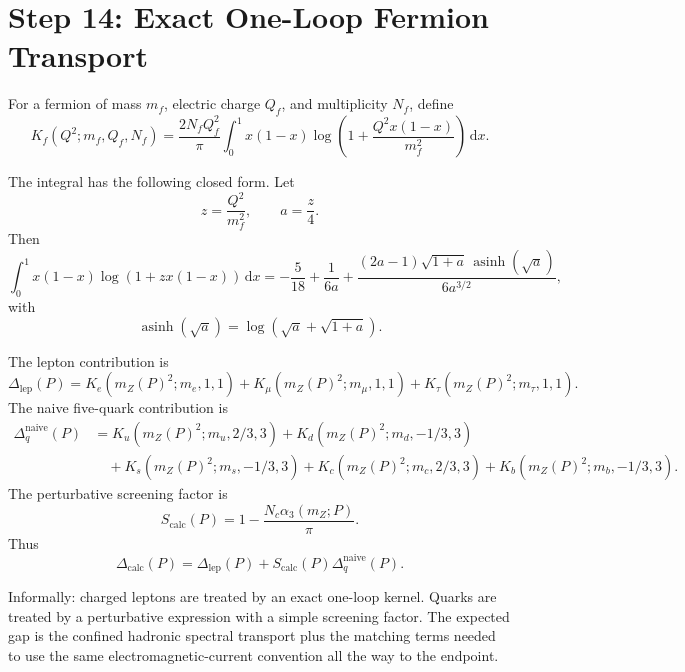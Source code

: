 \documentclass[11pt]{article}
\theoremstyle{remark}
\newcommand{\dd}{\,\mathrm d}
\newcommand{\Dcalc}{\Delta_{\mathrm{calc}}}
\newcommand{\Dlep}{\Delta_{\mathrm{lep}}}
\newcommand{\Nc}{N_c}
\begin{document}
\section{Step 14: Exact One-Loop Fermion Transport}

For a fermion of mass \(m_f\), electric charge \(Q_f\), and multiplicity \(N_f\), define
\begin{equation}
K_f(Q^2;m_f,Q_f,N_f)
=
\frac{2N_fQ_f^2}{\pi}
\int_0^1 x(1-x)
\log\!\left(1+\frac{Q^2x(1-x)}{m_f^2}\right)\dd x.
\label{eq:kernelint}
\end{equation}

The integral has the following closed form. Let
\begin{equation}
z=\frac{Q^2}{m_f^2},
\qquad
a=\frac{z}{4}.
\end{equation}
Then
\begin{equation}
\int_0^1 x(1-x)\log(1+zx(1-x))\dd x
=
-\frac{5}{18}
+\frac{1}{6a}
+\frac{(2a-1)\sqrt{1+a}\,\operatorname{asinh}(\sqrt a)}
{6a^{3/2}},
\label{eq:kernelclosed}
\end{equation}
with
\begin{equation}
\operatorname{asinh}(\sqrt a)
=
\log(\sqrt a+\sqrt{1+a}).
\end{equation}

The lepton contribution is
\begin{equation}
\Dlep(P)=
K_e(m_Z(P)^2;m_e,1,1)
+K_\mu(m_Z(P)^2;m_\mu,1,1)
+K_\tau(m_Z(P)^2;m_\tau,1,1).
\label{eq:Dlep}
\end{equation}
The naive five-quark contribution is
\begin{align}
\Delta_q^{\mathrm{naive}}(P)
&=
K_u(m_Z(P)^2;m_u,2/3,3)
+K_d(m_Z(P)^2;m_d,-1/3,3)
\nonumber\\
&\quad
+K_s(m_Z(P)^2;m_s,-1/3,3)
+K_c(m_Z(P)^2;m_c,2/3,3)
+K_b(m_Z(P)^2;m_b,-1/3,3).
\label{eq:Dqnaive}
\end{align}
The perturbative screening factor is
\begin{equation}
S_{\mathrm{calc}}(P)=
1-\frac{\Nc\alpha_3(m_Z;P)}{\pi}.
\label{eq:Scalc}
\end{equation}
Thus
\begin{equation}
\Dcalc(P)
=
\Dlep(P)+S_{\mathrm{calc}}(P)\Delta_q^{\mathrm{naive}}(P).
\label{eq:Dcalc}
\end{equation}

Informally: charged leptons are treated by an exact one-loop kernel. Quarks are treated by a perturbative expression with a simple screening factor. The expected gap is the confined hadronic spectral transport plus the matching terms needed to use the same electromagnetic-current convention all the way to the endpoint.
\end{document}
